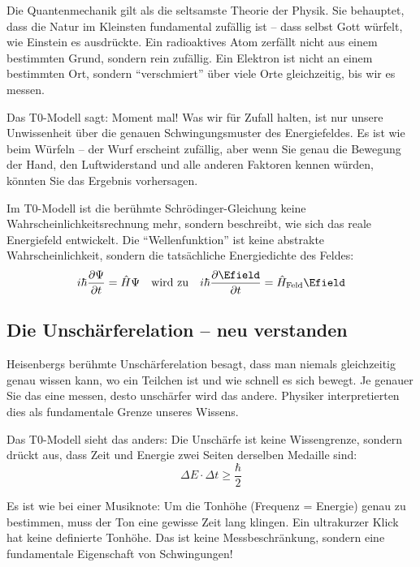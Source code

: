 	Die Quantenmechanik gilt als die seltsamste Theorie der Physik. Sie behauptet, dass die Natur im Kleinsten fundamental zufällig ist -- dass selbst Gott würfelt, wie Einstein es ausdrückte. Ein radioaktives Atom zerfällt nicht aus einem bestimmten Grund, sondern rein zufällig. Ein Elektron ist nicht an einem bestimmten Ort, sondern ``verschmiert'' über viele Orte gleichzeitig, bis wir es messen.
	
	Das T0-Modell sagt: Moment mal! Was wir für Zufall halten, ist nur unsere Unwissenheit über die genauen Schwingungsmuster des Energiefeldes. Es ist wie beim Würfeln -- der Wurf erscheint zufällig, aber wenn Sie genau die Bewegung der Hand, den Luftwiderstand und alle anderen Faktoren kennen würden, könnten Sie das Ergebnis vorhersagen.
	
	\begin{quantum}
		Im T0-Modell ist die berühmte Schrödinger-Gleichung keine Wahrscheinlichkeitsrechnung mehr, sondern beschreibt, wie sich das reale Energiefeld entwickelt. Die ``Wellenfunktion'' ist keine abstrakte Wahrscheinlichkeit, sondern die tatsächliche Energiedichte des Feldes:
		\begin{equation}
			i\hbar \frac{\partial \Psi}{\partial t} = \hat{H}\Psi \quad \text{wird zu} \quad i\hbar \frac{\partial \Efield}{\partial t} = \hat{H}_{\text{Feld}}\Efield
		\end{equation}
	\end{quantum}
	
	\subsection{Die Unschärferelation -- neu verstanden}
	
	Heisenbergs berühmte Unschärferelation besagt, dass man niemals gleichzeitig genau wissen kann, wo ein Teilchen ist und wie schnell es sich bewegt. Je genauer Sie das eine messen, desto unschärfer wird das andere. Physiker interpretierten dies als fundamentale Grenze unseres Wissens.
	
	Das T0-Modell sieht das anders: Die Unschärfe ist keine Wissengrenze, sondern drückt aus, dass Zeit und Energie zwei Seiten derselben Medaille sind:
	\begin{equation}
		\Delta E \cdot \Delta t \geq \frac{\hbar}{2}
	\end{equation}
	
	Es ist wie bei einer Musiknote: Um die Tonhöhe (Frequenz = Energie) genau zu bestimmen, muss der Ton eine gewisse Zeit lang klingen. Ein ultrakurzer Klick hat keine definierte Tonhöhe. Das ist keine Messbeschränkung, sondern eine fundamentale Eigenschaft von Schwingungen!
	
